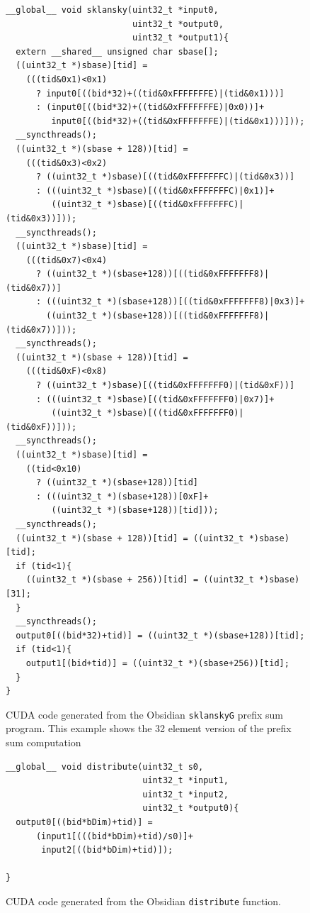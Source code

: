 \begin{figure} 
\newcommand{\myfontsize}{\fontsize{7}{9}\selectfont}
{\myfontsize
\begin{verbatim} 
__global__ void sklansky(uint32_t *input0,
                         uint32_t *output0,
                         uint32_t *output1){
  extern __shared__ unsigned char sbase[];
  ((uint32_t *)sbase)[tid] = 
    (((tid&0x1)<0x1) 
      ? input0[((bid*32)+((tid&0xFFFFFFFE)|(tid&0x1)))] 
      : (input0[((bid*32)+((tid&0xFFFFFFFE)|0x0))]+
         input0[((bid*32)+((tid&0xFFFFFFFE)|(tid&0x1)))]));
  __syncthreads();
  ((uint32_t *)(sbase + 128))[tid] = 
    (((tid&0x3)<0x2) 
      ? ((uint32_t *)sbase)[((tid&0xFFFFFFFC)|(tid&0x3))] 
      : (((uint32_t *)sbase)[((tid&0xFFFFFFFC)|0x1)]+
         ((uint32_t *)sbase)[((tid&0xFFFFFFFC)|(tid&0x3))]));
  __syncthreads();
  ((uint32_t *)sbase)[tid] = 
    (((tid&0x7)<0x4) 
      ? ((uint32_t *)(sbase+128))[((tid&0xFFFFFFF8)|(tid&0x7))] 
      : (((uint32_t *)(sbase+128))[((tid&0xFFFFFFF8)|0x3)]+
        ((uint32_t *)(sbase+128))[((tid&0xFFFFFFF8)|(tid&0x7))]));
  __syncthreads();
  ((uint32_t *)(sbase + 128))[tid] = 
    (((tid&0xF)<0x8) 
      ? ((uint32_t *)sbase)[((tid&0xFFFFFFF0)|(tid&0xF))] 
      : (((uint32_t *)sbase)[((tid&0xFFFFFFF0)|0x7)]+
         ((uint32_t *)sbase)[((tid&0xFFFFFFF0)|(tid&0xF))]));
  __syncthreads();
  ((uint32_t *)sbase)[tid] = 
    ((tid<0x10) 
      ? ((uint32_t *)(sbase+128))[tid] 
      : (((uint32_t *)(sbase+128))[0xF]+
         ((uint32_t *)(sbase+128))[tid]));
  __syncthreads();
  ((uint32_t *)(sbase + 128))[tid] = ((uint32_t *)sbase)[tid];
  if (tid<1){
    ((uint32_t *)(sbase + 256))[tid] = ((uint32_t *)sbase)[31];
  }
  __syncthreads();
  output0[((bid*32)+tid)] = ((uint32_t *)(sbase+128))[tid];
  if (tid<1){
    output1[(bid+tid)] = ((uint32_t *)(sbase+256))[tid];
  }
}
\end{verbatim} 
}
\caption{CUDA code generated from the Obsidian {\tt sklanskyG} prefix sum program. 
 This example shows the 32 element version of the prefix sum computation}
\label{fig:genSklansky} 
\end{figure}

\begin{figure} 
\begin{small}
\begin{verbatim} 
__global__ void distribute(uint32_t s0, 
                           uint32_t *input1,
                           uint32_t *input2,
                           uint32_t *output0){
  output0[((bid*bDim)+tid)] = 
      (input1[(((bid*bDim)+tid)/s0)]+
       input2[((bid*bDim)+tid)]);
  
}
\end{verbatim} 
\end{small}
\caption{CUDA code generated from the Obsidian {\tt distribute} function.}
\label{fig:genDistrib} 
\end{figure}

